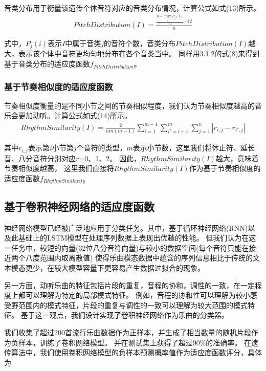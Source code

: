 \documentclass{article}
\begin{document}
音类分布用于衡量该遗传个体音符对应的音类分布情况，计算公式如式(13)所示。
\begin{gather}
    PitchDistribution(I)=\frac{\frac{n-\max_j P_j(I)}{11}\cdot 12}{n}
\end{gather}

式中，$P_j(i)$表示$I$中属于音类$j$的音符个数，音类分布$PitchDistribution(I)$越大，表示该个体中音符更均匀地分布在各个音类当中。
同样用3.1.2的式(8)来得到基于音类分布的适应度函数$f_{PitchDistribution}$。

\subsubsection{基于节奏相似度的适应度函数}

节奏相似度衡量的是不同小节之间的节奏相似程度，我们认为节奏相似度越高的音乐会更加动听。计算公式如式(14)所示。
\begin{align}
    RhythmSimilarity(I) = \frac{2}{nm(m-1)}\sum_{i=1}^{m-1} \sum_{i'=i+1}^{m} \sum_{j=1}^{n} |r_{i,j}-r_{i',j}|
\end{align}

其中$r_{i,j}$表示第$i$小节第$j$个音符的类型，$m$表示小节数，这里我们将休止符、延长音、八分音符分别对应$r$=0、1、2。
因此，$RhythmSimilarity(I)$越大，意味着节奏相似度越高，
这里我们直接将$RhythmSimilarity(I)$作为基于节奏相似度的适应度函数$f_{RhythmSimilarity}$

\subsection{基于卷积神经网络的适应度函数}
神经网络模型已经被广泛地应用于分类任务。其中，基于循环神经网络(RNN)以及此基础上的LSTM模型在处理序列数据上表现出优越的性能。
但我们认为在这一任务中，较短的向量(32位八分音符向量)与较小的数据空间(每个音符只能在接近两个八度范围内取离散值)
使得乐曲模态数据中蕴含的序列信息相比于传统的文本模态更少，在较大模型容量下更容易产生数据过拟合的现象。

另一方面，动听乐曲的特征包括片段的重复，音程的协和，调性的一致，在一定程度上都可以理解为特定的局部模式特征。
例如，音程的协和性可以理解为较小感受野范围内的模式特征，片段的重复与调性的一致可以理解为较大范围的模式特征。
基于这一观点，我们设计实现了卷积神经网络作为乐曲的分类器。

我们收集了超过200首流行乐曲数据作为正样本，并生成了相当数量的随机片段作为负样本，训练了卷积网络模型。
并在测试集上获得了超过90\%的准确率。
在遗传算法中，我们使用卷积网络模型的负样本预测概率值作为适应度函数评分，具体为
\end{document}
